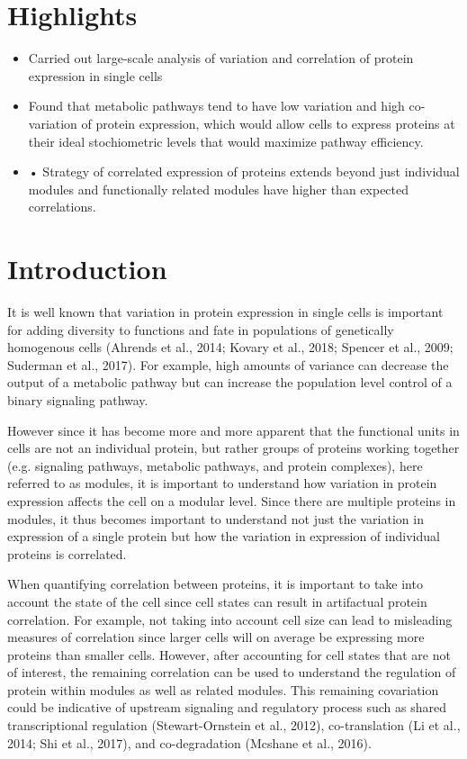 \section{Highlights}
\begin{itemize}
\item Carried out large-scale analysis of variation and correlation of protein expression in single cells
\item Found that metabolic pathways tend to have low variation and high co-variation of protein expression, which would allow cells to express proteins at their ideal stochiometric levels that would maximize pathway efficiency.
\item •	Strategy of correlated expression of proteins extends beyond just individual modules and functionally related modules have higher than expected correlations.
\end{itemize}

\section{Introduction}
It is well known that variation in protein expression in single cells is important for adding diversity to functions and fate in populations of genetically homogenous cells (Ahrends et al., 2014; Kovary et al., 2018; Spencer et al., 2009; Suderman et al., 2017).  For example, high amounts of variance can decrease the output of a metabolic pathway but can increase the population level control of a binary signaling pathway. 

However since it has become more and more apparent that the functional units in cells are not an individual protein, but rather groups of proteins working together (e.g. signaling pathways, metabolic pathways, and protein complexes), here referred to as modules, it is important to understand how variation in protein expression affects the cell on a modular level. Since there are multiple proteins in modules, it thus becomes important to understand not just the variation in expression of a single protein but how the variation in expression of individual proteins is correlated.

When quantifying correlation between proteins, it is important to take into account the state of the cell since cell states can result in artifactual protein correlation. For example, not taking into account cell size can lead to misleading measures of correlation since larger cells will on average be expressing more proteins than smaller cells. However, after accounting for cell states that are not of interest, the remaining correlation can be used to understand the regulation of protein within modules as well as related modules. This remaining covariation could be indicative of upstream signaling and regulatory process such as shared transcriptional regulation (Stewart-Ornstein et al., 2012), co-translation (Li et al., 2014; Shi et al., 2017), and co-degradation (Mcshane et al., 2016).

